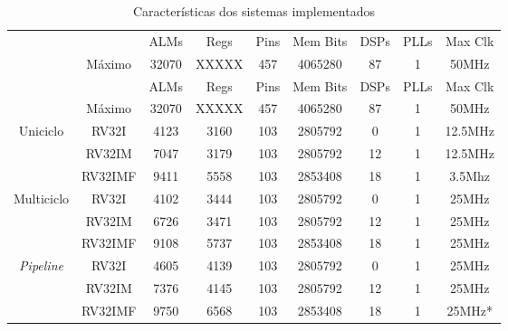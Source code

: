     \vspace{0.2cm}
    \begin{longtable}{cc|c|c|c|c|c|c|c|}
        \caption{Características dos sistemas implementados}\label{table:synth_resources}\\
        \cline{3-9}
                                                                &                               & ALMs  & Regs  & Pins  & Mem Bits  & DSPs  & PLLs  & Max Clk   \\
        \cline{2-9}
                                                                & \multicolumn{1}{|c|}{Máximo}  & 32070 & XXXXX & 457   & 4065280   & 87    & 1     & 50MHz     \\
        \hline
        \endfirsthead
        \cline{3-9}
                                                                &                               & ALMs  & Regs  & Pins  & Mem Bits  & DSPs  & PLLs  & Max Clk   \\
        \cline{2-9}
                                                                & \multicolumn{1}{|c|}{Máximo}  & 32070 & XXXXX & 457   & 4065280   & 87    & 1     & 50MHz     \\
        \hline
        \endhead
        \multicolumn{1}{|c}{\multirow{3}{*}{{Uniciclo}}}        & \multicolumn{1}{|c|}{RV32I}   & 4123  & 3160  & 103   & 2805792   & 0     & 1     & 12.5MHz   \\*
        \cline{2-9}
        \multicolumn{1}{|c}{ }                                  & \multicolumn{1}{|c|}{RV32IM}  & 7047  & 3179  & 103   & 2805792   & 12    & 1     & 12.5MHz   \\*
        \cline{2-9}
        \multicolumn{1}{|c}{ }                                  & \multicolumn{1}{|c|}{RV32IMF} & 9411  & 5558  & 103   & 2853408   & 18    & 1     & 3.5Mhz    \\
        \hline
        \multicolumn{1}{|c}{\multirow{3}{*}{{Multiciclo}}}      & \multicolumn{1}{|c|}{RV32I}   & 4102  & 3444  & 103   & 2805792   & 0     & 1     & 25MHz     \\*
        \cline{2-9}
        \multicolumn{1}{|c}{ }                                  & \multicolumn{1}{|c|}{RV32IM}  & 6726  & 3471  & 103   & 2805792   & 12    & 1     & 25MHz     \\*
        \cline{2-9}
        \multicolumn{1}{|c}{ }                                  & \multicolumn{1}{|c|}{RV32IMF} & 9108  & 5737  & 103   & 2853408   & 18    & 1     & 25MHz     \\
        \hline
        \multicolumn{1}{|c}{\multirow{3}{*}{\textit{Pipeline}}} & \multicolumn{1}{|c|}{RV32I}   & 4605  & 4139  & 103   & 2805792   & 0     & 1     & 25MHz     \\*
        \cline{2-9}
        \multicolumn{1}{|c}{ }                                  & \multicolumn{1}{|c|}{RV32IM}  & 7376  & 4145  & 103   & 2805792   & 12    & 1     & 25MHz     \\*
        \cline{2-9}
        \multicolumn{1}{|c}{ }                                  & \multicolumn{1}{|c|}{RV32IMF} & 9750  & 6568  & 103   & 2853408   & 18    & 1     & 25MHz*    \\
        \hline
    \end{longtable}

